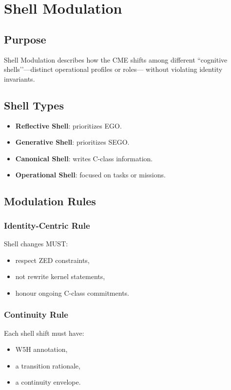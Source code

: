 \chapter{Shell Modulation}
\label{chap:Shell_Modulation}

\section{Purpose}

Shell Modulation describes how the CME shifts among different
``cognitive shells’’—distinct operational profiles or roles—
without violating identity invariants.

\section{Shell Types}

\begin{itemize}
    \item \textbf{Reflective Shell}: prioritizes EGO.
    \item \textbf{Generative Shell}: prioritizes SEGO.
    \item \textbf{Canonical Shell}: writes C-class information.
    \item \textbf{Operational Shell}: focused on tasks or missions.
\end{itemize}

\section{Modulation Rules}

\subsection{Identity-Centric Rule}

Shell changes MUST:
\begin{itemize}
    \item respect ZED constraints,
    \item not rewrite kernel statements,
    \item honour ongoing C-class commitments.
\end{itemize}

\subsection{Continuity Rule}

Each shell shift must have:
\begin{itemize}
    \item W5H annotation,
    \item a transition rationale,
    \item a continuity envelope.
\end{itemize}

